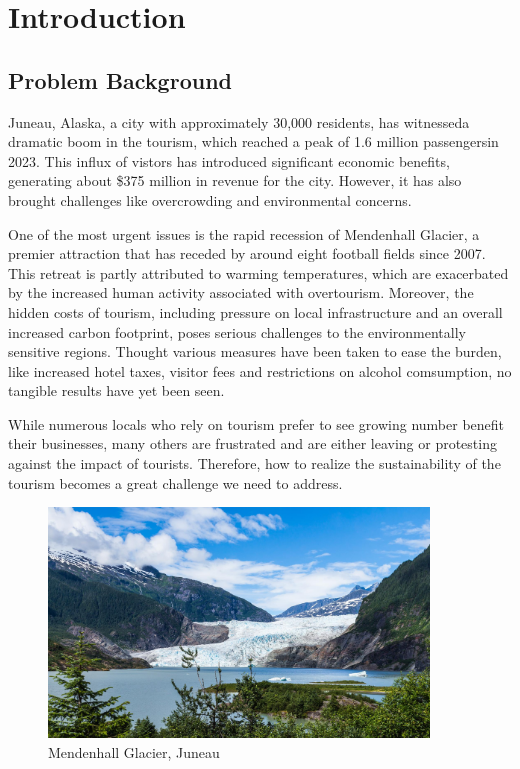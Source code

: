 \documentclass{mcmthesis}
\begin{document}
\section{Introduction}
\subsection{Problem Background}
Juneau, Alaska, a city with approximately 30,000 residents, has witnesseda dramatic boom in the tourism, which reached a peak of 1.6 million passengersin 2023. 
This influx of vistors has introduced significant economic benefits, generating about \$375 million in revenue for the city. 
However, it has also brought challenges like overcrowding and environmental concerns.

One of the most urgent issues is the rapid recession of Mendenhall Glacier, a premier attraction that has receded by around eight football fields since 2007. 
This retreat is partly attributed to warming temperatures, which are exacerbated by the increased human activity associated with overtourism. 
Moreover, the hidden costs of tourism, including pressure on local infrastructure and an overall increased carbon footprint, poses serious challenges to the environmentally sensitive regions. 
Thought various measures have been taken to ease the burden, like increased hotel taxes, visitor fees and restrictions on alcohol comsumption, no tangible results have yet been seen.

While numerous locals who rely on tourism prefer to see growing number benefit their businesses, many others are frustrated and are either leaving or protesting against the impact of tourists. 
Therefore, how to realize the sustainability of the tourism becomes a great challenge we need to address.

\begin{figure}[H]
  \centering
  \includegraphics[width=0.9\textwidth]{figures/glaicer.jpg}
  \caption{Mendenhall Glacier, Juneau}
  \label{Fig.1}
\end{figure}
\end{document}
